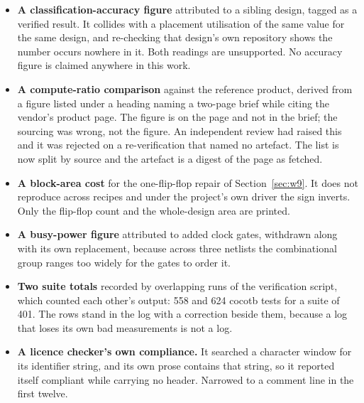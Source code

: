 \documentclass[11pt,a4paper]{article}
\begin{document}
\begin{itemize}\itemsep2pt
\item \textbf{A classification-accuracy figure} attributed to a sibling
design, tagged as a verified result. It collides with a placement
utilisation of the same value for the same design, and re-checking that
design's own repository shows the number occurs nowhere in it. Both
readings are unsupported. No accuracy figure is claimed anywhere in this
work.
\item \textbf{A compute-ratio comparison} against the reference product,
derived from a figure listed under a heading naming a two-page brief
while citing the vendor's product page. The figure is on the page and not
in the brief; the sourcing was wrong, not the figure. An independent
review had raised this and it was rejected on a re-verification that
named no artefact. The list is now split by source and the artefact is a
digest of the page as fetched.
\item \textbf{A block-area cost} for the one-flip-flop repair of
Section~\ref{sec:w9}. It does not reproduce across recipes and under the
project's own driver the sign inverts. Only the flip-flop count and the
whole-design area are printed.
\item \textbf{A busy-power figure} attributed to added clock gates,
withdrawn along with its own replacement, because across three netlists
the combinational group ranges too widely for the gates to order it.
\item \textbf{Two suite totals} recorded by overlapping runs of the
verification script, which counted each other's output: 558 and 624
cocotb tests for a suite of 401. The rows stand in the log with a
correction beside them, because a log that loses its own bad measurements
is not a log.
\item \textbf{A licence checker's own compliance.} It searched a
character window for its identifier string, and its own prose contains
that string, so it reported itself compliant while carrying no header.
Narrowed to a comment line in the first twelve.
\end{itemize}
\end{document}
